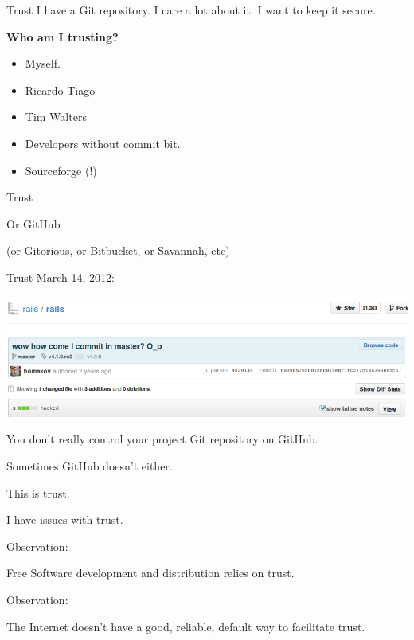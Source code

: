 \documentclass{beamer}
\begin{document}
\begin{frame}{Trust}
  I have a Git repository.  I care a lot about it.  I want to keep it
  secure.
  
  \textbf{Who am I trusting?}
  \pause
  \begin{itemize}
  \item Myself.
    \pause
  \item Ricardo Tiago
  \item Tim Walters
    \pause
  \item Developers without commit bit.
    \pause
  \item Sourceforge (!)
  \end{itemize}
\end{frame}

\begin{frame}{Trust}
  \centerline{\Huge Or GitHub}
  \centerline{(or Gitorious, or Bitbucket, or Savannah, etc)}
\end{frame}

\begin{frame}{Trust}
  March 14, 2012:
  \begin{center}
    \includegraphics[width=\textwidth]{github-hack}
  \end{center}
  \pause
  You don't really control your project Git repository on GitHub.

  \pause
  Sometimes GitHub doesn't either.

  This is trust.
\end{frame}

\begin{frame}{}
  \centerline{\Huge I have issues with trust.}
\end{frame}

\begin{frame}{}
  Observation:

  \begin{center}
    \Large Free Software development and distribution relies on trust.
  \end{center}
\end{frame}

\begin{frame}{}
  Observation:

  \begin{center}
    \Large The Internet doesn't have a good, reliable, default way to
    facilitate trust.
  \end{center}
\end{frame}
\end{document}

